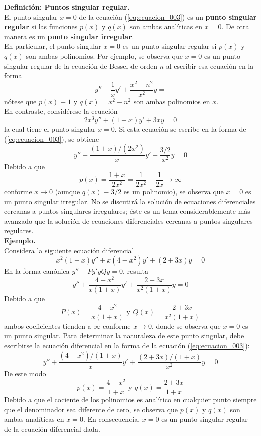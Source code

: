 \textbf{Definición: Puntos singular regular.}
\\
El punto singular $x = 0$ de la ecuación (\ref{eq:ecuacion_003}) es un \textbf{punto singular regular} si las funciones $p(x)$ y $q(x)$ son ambas analíticas en $x = 0$. De otra manera es un \textbf{punto singular irregular}.
\\
En particular, el punto singular $x = 0$ es un punto singular regular si $p(x)$ y $q(x)$ son ambas polinomios. Por ejemplo, se observa que $x = 0$ es un punto singular regular de la ecuación de Bessel de orden $n$ al escribir esa ecuación en la forma
\[ y'' + \dfrac{1}{x} y' + \dfrac{x^{2} - n^{2}}{x^{2}}y =  \]
nótese que $p(x) \equiv 1$ y $q(x)= x^{2} - n^{2}$ son ambas polinomios en $x$.
\\
En contraste, considérese la ecuación
\[ 2 x^{3} y'' + (1+x) y' + 3xy = 0 \]
la cual tiene el punto singular $x = 0$. Si esta ecuación se escribe en la forma de (\ref{eq:ecuacion_003}), se obtiene
\[ y'' + \dfrac{(1+x)/(2x^{2})}{x} y' + \dfrac{3/2}{x^{2}} y = 0 \]
Debido a que
\[ p(x) = \dfrac{1 + x}{2x^{2}} =  \dfrac{1}{2x^{2}} + \dfrac{1}{2x} \to \infty \]
conforme $x \to 0$ (aunque $q(x) \equiv 3/2$ es un polinomio), se observa que $x = 0$ es un punto singular irregular. No se discutirá la solución de ecuaciones diferenciales cercanas a puntos singulares irregulares; éste es un tema considerablemente más avanzado que la solución de ecuaciones diferenciales cercanas a puntos singulares regulares.
\\
\textbf{Ejemplo.}
\\
Considera la siguiente ecuación diferencial
\[ x^{2}(1+x)y'' + x(4-x^{2}) y' + (2+3x)y = 0 \]
En la forma canónica $y'' + Py' y Qy = 0$, resulta
\[  y'' + \dfrac{4-x^{2}}{x(1+x)} y' + \dfrac{2+3x}{x^{2}(1+x)} y = 0 \]
Debido a que
\[ P(x) = \dfrac{4-x^{2}}{x(1+x)} \mbox{ y } Q(x) = \dfrac{2+3x}{x^{2}(1+x)} \]
ambos coeficientes tienden a $\infty$ conforme $x \to 0$, donde se observa que $x = 0$ es un punto singular. Para determinar la naturaleza de este punto singular, debe escribirse la ecuación diferencial en la forma de la ecuación (\ref{eq:ecuacion_003}):
\[ y'' + \dfrac{(4-x^{2})/(1+x)}{x} y' + \dfrac{(2+3x)/(1+x)}{x^{2}} y = 0 \]
De este modo
\[ p(x) = \dfrac{4-x^{2}}{1+x} \mbox{ y } q(x) = \dfrac{2+3x}{1+x} \]
Debido a que el cociente de los polinomios es analítico en cualquier punto siempre que el denominador sea diferente de cero, se observa que $p(x)$ y $q(x)$ son ambas analíticas en $x = 0$. En consecuencia, $x = 0$ es un punto singular regular de la ecuación diferencial dada.
